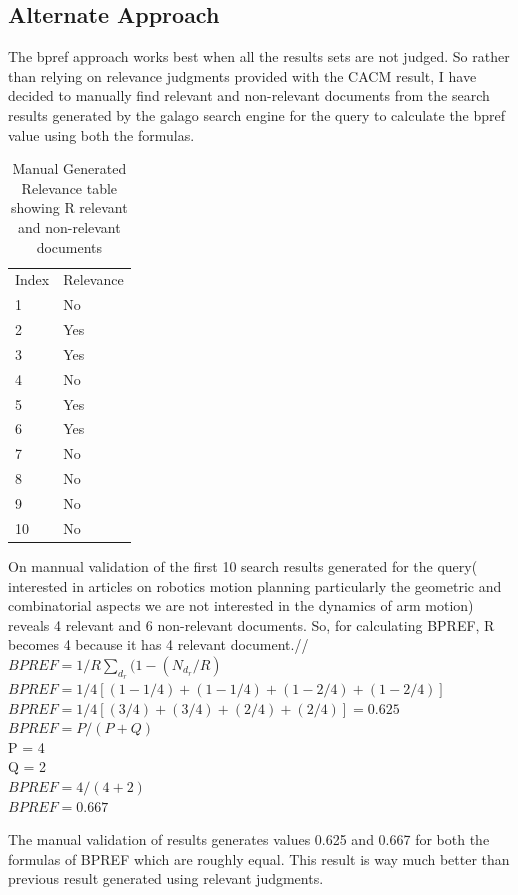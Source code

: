 \documentclass[12pt]{report}
\begin{document}
\subsection{Alternate Approach}
The bpref approach works best when all the results sets are not judged. So rather than relying on relevance judgments provided with the CACM result, I have decided to manually find relevant and non-relevant documents from the search results generated by the galago search engine for the query to calculate the bpref value using both the formulas.

\begin{table}[]
\centering
\caption{Manual Generated Relevance table showing R relevant and non-relevant documents}
\label{my-label}
\begin{tabular}{ll}
Index & Relevance \\
1     & No       \\
2     & Yes        \\
3     & Yes        \\
4     & No       \\
5     & Yes        \\
6     & Yes      \\
7     &No       \\
8    &No        \\
9    & No       \\
10   & No
\end{tabular}
\end{table}

On mannual validation of the first 10 search results generated for the query( interested in articles on robotics  motion planning particularly the geometric and combinatorial aspects we are not interested in the dynamics of arm motion) reveals 4 relevant and 6 non-relevant documents. So, for calculating BPREF, R becomes 4 because it has 4 relevant document.//
$BPREF = 1/R \sum\limits_{d_r}^{}(1- ({N_{d_r}} / R)$\\
$BPREF = 1/4[(1-1/4) + (1 - 1/4) + (1- 2/4) + (1-2/4)]$\\
$BPREF = 1/4 [(3/4) + (3/4) + (2/4) + (2/4)] = 0.625$\\
$BPREF = P /( P + Q)$\\
P = 4\\
Q = 2\\
$BPREF = 4/(4+2)$\\
$BPREF = 0.667$

The manual validation of results generates values 0.625 and 0.667 for both the formulas of BPREF which are roughly equal. This result is way much better than previous result generated using relevant judgments.
 
\end{document}
